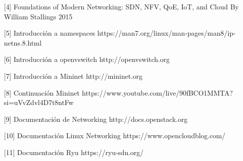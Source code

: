 \documentclass[a4paper, 12pt]{book}
\begin{document}
	[4]  Foundations of Modern Networking: SDN, NFV, QoE, IoT, and Cloud By William Stallings 2015
	
	[5]  Introducción a namespaces https://man7.org/linux/man-pages/man8/ip-netns.8.html
	
	[6]  Introducción a openvswitch http://openvswitch.org
	
	[7]  Introducción a Mininet http://mininet.org
	
	[8]  Continuación Mininet https://www.youtube.com/live/90fBCO1MMTA?si=uVvZdvl4D7t8ntFw
	
	[9]  Documentación de Networking http://docs.openstack.org
	
	[10] Documentación Linux Networking https://www.opencloudblog.com/
	
	[11] Documentación Ryu https://ryu-sdn.org/
	
 	
	
\end{document}

